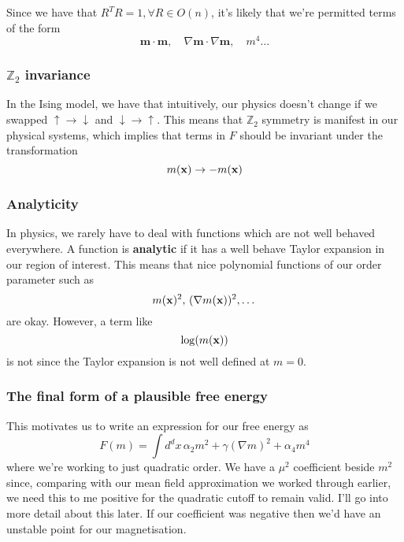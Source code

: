 Since we have that $R^T R = 1, \forall R \in O(n)$, it's likely that we're permitted terms of the form 
\[
\mathbf{m} \cdot \mathbf{m}, \quad \nabla \mathbf{m} \cdot \nabla \mathbf{m}, \quad m^4 \dots 
\]

\subsubsection*{$\mathbb{ Z}_2 $ invariance}
In the Ising model, we have that intuitively, our physics doesn't change if we swapped $\uparrow \rightarrow \downarrow$ and $\downarrow \rightarrow \uparrow$. This means that $\mathbb{ Z}_2 $ symmetry is manifest in our physical systems, which implies that terms in $F$ should be invariant under the transformation 
\[ 
m ( \mathbf{ x} ) \rightarrow  - m( \mathbf{   x} ) 
\]
\subsubsection*{Analyticity} 
In physics, we rarely have to deal with functions which are not well behaved everywhere. A function is \textbf{analytic} if it has a well behave Taylor expansion in our region of interest. This means that nice polynomial functions of our order parameter such as 
\[ 
m ( \mathbf{ x} )^2, \, ( \nabla m ( \mathbf{ x} ) )^2, \dots 
\] are okay. However, a term like 
\[ 
 \log ( m ( \mathbf{ x} ) ) 
\] is not since the Taylor expansion is not well defined at $m = 0$. 

\subsubsection*{The final form of a plausible free energy} 

This motivates us to write an expression for our free energy as 
\[	
F(m) = \int d^d x\,  \alpha_2 m^2 + \gamma (\nabla m)^2 + \alpha_4 m^4
\] where we're working to just quadratic order. 
We have a $\mu^2$ coefficient beside $m^2 $ since, comparing with our mean field approximation we worked through earlier, we need this to me positive for the quadratic cutoff to remain valid. I'll go into more detail about this later. If our coefficient was negative then we'd have an unstable point for our magnetisation. 

